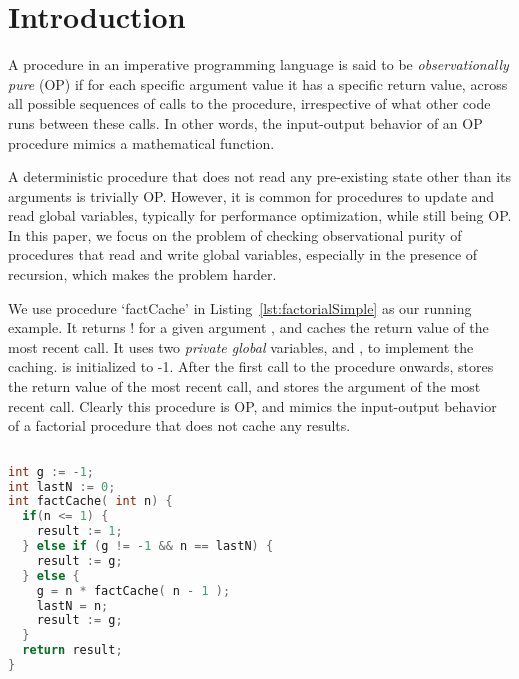 \section{Introduction}
\label{sec:intro}

A procedure in an imperative programming language is said to be
\emph{observationally pure} (OP) if for each specific argument value it has
a specific return value, across all possible sequences of calls to the
procedure, irrespective of what other code runs between these calls.  In
other words, the input-output behavior of an OP procedure mimics a mathematical
function.


A deterministic procedure that does not read any
pre-existing state other than its arguments is trivially OP.
However, it is common for procedures to update and read global variables,
typically for performance optimization,
while still being OP.
In this paper, we focus on the problem of checking observational purity of
procedures that read and write global variables, especially in the presence of recursion,
which makes the problem harder.

We use procedure `factCache' in Listing~\ref{lst:factorialSimple}  as our running example. It
returns ! for a given argument , and caches the return value of the
most recent call. It uses two \emph{private global} variables,  and , to
implement the caching.  is initialized to -1. After
the first call to the procedure onwards,  stores the return value
of the most recent call, and  stores the argument of
the most recent call. Clearly this procedure is OP, and mimics the
input-output behavior of a factorial procedure that does not cache
any results. 

\begin{lstlisting}[float,language=c,basicstyle=\scriptsize,caption= {Procedure factCache:
      returns n!, and memoizes most recent result.},
    label=lst:factorialSimple]
  
int g := -1;
int lastN := 0;
int factCache( int n) {
  if(n <= 1) {
    result := 1;
  } else if (g != -1 && n == lastN) {
    result := g;
  } else {
    g = n * factCache( n - 1 );
    lastN = n;
    result := g;
  }
  return result;
}
\end{lstlisting}

